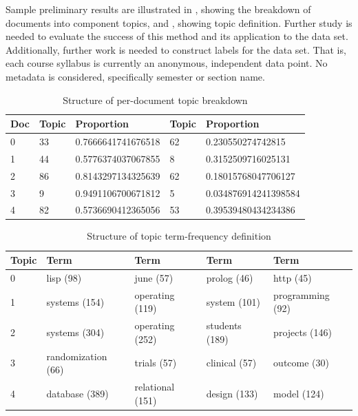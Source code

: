 Sample preliminary results are illustrated in , showing
the breakdown of documents into component topics, and
, showing topic definition.  Further study is needed
to evaluate the success of this method and its application to the data set.
Additionally, further work is needed to construct labels for the data set.
That is, each course syllabus is currently an anonymous, independent data
point. No metadata is considered, specifically semester or section name.


\begin{table}[ht]
\centering
\begin{tabular}{lllll}
\toprule
Doc & Topic & Proportion & Topic & Proportion \\
\midrule
0 & 33 & 0.7666641741676518 & 62 & 0.230550274742815 \\
1 & 44 & 0.5776374037067855 & 8  & 0.3152509716025131 \\
2 & 86 & 0.8143297134325639 & 62 & 0.18015768047706127 \\
3 & 9  & 0.9491106700671812 & 5  & 0.034876914241398584 \\
4 & 82 & 0.5736690412365056 & 53 & 0.39539480434234386 \\
\bottomrule
\end{tabular}
\caption{Structure of per-document topic breakdown\label{table:ldadocs}}
\end{table}


\begin{table}[ht]
\centering
\begin{tabular}{lllll}
\toprule
Topic & Term & Term & Term & Term \\
\midrule
0 & lisp (98)          & june (57)        & prolog (46)    & http (45) \\
1 & systems (154)      & operating (119)  & system (101)   & programming (92) \\
2 & systems (304)      & operating (252)  & students (189) & projects (146) \\
3 & randomization (66) & trials (57)      & clinical (57)  & outcome (30) \\
4 & database (389)     & relational (151) & design (133)   & model (124) \\
\bottomrule
\end{tabular}
\caption{Structure of topic term-frequency definition\label{table:ldatopics}}
\end{table}



